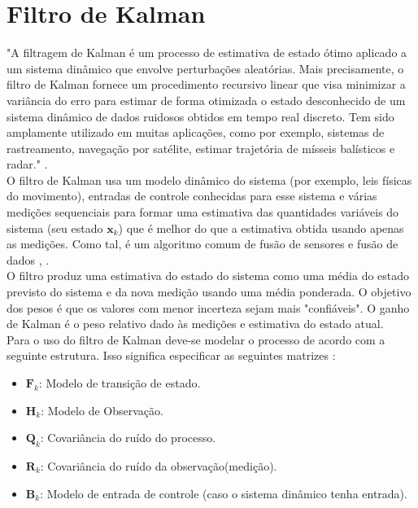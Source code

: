 \section{Filtro de Kalman}
\label{sec:kalman}
"A filtragem de Kalman é um processo de estimativa de estado ótimo aplicado a um sistema dinâmico que envolve perturbações aleatórias. Mais precisamente, o filtro de Kalman fornece um  procedimento recursivo linear que visa minimizar a variância do erro para estimar de forma otimizada o estado desconhecido de um sistema dinâmico de dados ruidosos obtidos em tempo real discreto. Tem sido amplamente utilizado em muitas aplicações, como por exemplo, sistemas de rastreamento, navegação por satélite, estimar trajetória de mísseis balísticos e radar." \cite{kalman:book}.\\

O filtro de Kalman usa um modelo dinâmico do sistema (por exemplo, leis físicas do movimento), entradas de controle conhecidas para esse sistema e várias medições sequenciais para formar uma estimativa das quantidades variáveis do sistema (seu estado $\textbf{x}_k$) que é melhor do que a estimativa obtida usando apenas as medições. Como tal, é um algoritmo comum de fusão de sensores e fusão de dados \cite{kalman:wiki}, \cite{Kalman:ofid}.\\

O filtro produz uma estimativa do estado do sistema como uma média do estado previsto do sistema e da nova medição usando uma média ponderada. O objetivo dos pesos é que os valores com menor incerteza sejam mais "confiáveis". O ganho de Kalman é o peso relativo dado às medições e estimativa do estado atual.\\

Para o uso do filtro de Kalman deve-se modelar o processo de acordo com a seguinte estrutura. Isso significa especificar as seguintes matrizes \cite{kalman:book}:

\begin{itemize}
    \item $\textbf{F}_k$: Modelo de transição de estado.
    \item $\textbf{H}_k$: Modelo de Observação.
    \item $\textbf{Q}_k$: Covariância do ruído do processo.
    \item $\textbf{R}_k$: Covariância do ruído da observação(medição).
    \item $\textbf{B}_k$: Modelo de entrada de controle (caso o sistema dinâmico tenha entrada). 
\end{itemize}


